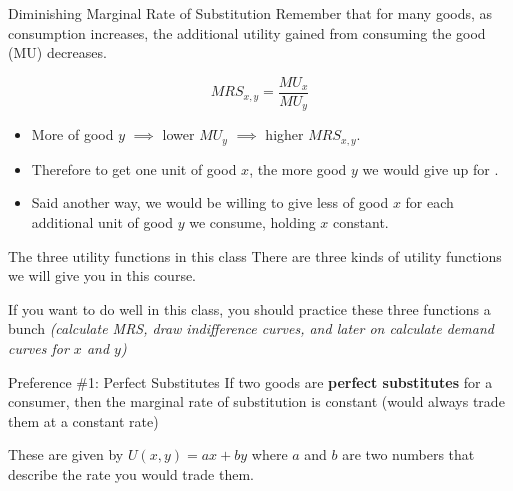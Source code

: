 \documentclass{beamer}
\begin{document}
\begin{frame}{Diminishing Marginal Rate of Substitution}
  Remember that for many goods, as consumption increases, the additional utility gained from consuming the good (MU) decreases.

  $$
    MRS_{x,y} = \frac{MU_x}{MU_{y}}
  $$
  
  \begin{itemize}
    \item More of good $y$ $\implies$ lower $MU_{y}$ $\implies$ higher $MRS_{x,y}$. 
    
    \item Therefore to get one unit of good $x$, the more good $y$ we would give up for . 

    \item Said another way, we would be willing to give less of good $x$ for each additional unit of good $y$ we consume, holding $x$ constant.
  \end{itemize}
\end{frame}

\begin{frame}{The three utility functions in this class}
  There are three kinds of utility functions we will give you in this course. 
  
  \bigskip\bigskip
  If you want to do well in this class, you should practice these three functions a bunch \emph{(calculate MRS, draw indifference curves, and later on calculate demand curves for $x$ and $y$)}
\end{frame}

\begin{frame}{Preference \#1: Perfect Substitutes}
  If two goods are \textbf{perfect substitutes} for a consumer, then the marginal rate of substitution is constant (would always trade them at a constant rate)

  \bigskip
  These are given by $U(x,y) = ax + by$ where $a$ and $b$ are two numbers that describe the rate you would trade them.
\end{frame}
\end{document}
